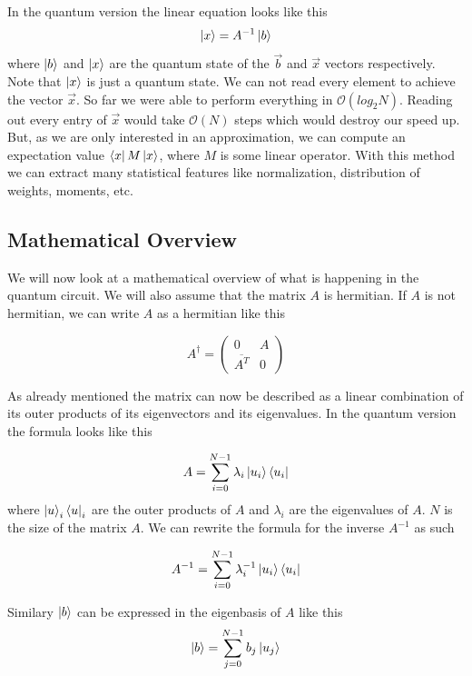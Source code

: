 In the quantum version the linear equation looks like this
\begin{equation}
\ket{x} = A^{-1}\ket{b}
\end{equation}
where $\ket b$ and $\ket x$ are the quantum state of the $\vec b$ and $\vec x$ vectors respectively.
Note that  $\ket x$ is just a quantum state. 
We can not read every element to achieve the vector $\vec x$. 
So far we were able to perform everything in $\mathcal{O}(log_2 N)$.
Reading out every entry of $\vec x$ would take $\mathcal{O} (N)$ steps which would destroy our speed up.
But, as we are only interested in an approximation, we can compute an expectation value $\bra x M \ket x$, where $M$ is some linear operator. 
With this method we can extract many statistical features like normalization, distribution of weights, moments, etc.



\subsection{Mathematical Overview}
We will now look at a mathematical overview of what is happening in the quantum circuit.
We will also assume that the matrix $A$ is hermitian. If $A$ is not hermitian, we can write $A$ as a hermitian like this

\begin{equation}
A^\dagger = \begin{pmatrix} 0 & A \\ \overline{A^T}& 0 \end{pmatrix}
\end{equation}

As already mentioned the matrix can now be described as a linear combination of its outer products of its eigenvectors and its eigenvalues.
In the quantum version the formula looks like this

\begin{equation}
A = \sum_{i=0}^{N-1} \lambda_i \ket{u_i}\bra{u_i}
\end{equation}
where $\ket u_i  \bra u_i$ are the outer products of $A$ and $\lambda_i$ are the eigenvalues of $A$. 
$N$ is the size of the matrix $A$.
We can rewrite the formula for the inverse $A^{-1}$ as such

\begin{equation}
A^{-1} = \sum_{i=0}^{N-1} \lambda_i^{-1} \ket{u_i}\bra{u_i}
\end{equation}

Similary $\ket b$ can be expressed in the eigenbasis of $A$ like this
\begin{equation}
\ket{b} = \sum_{j=0}^{N-1} b_j\ket{u_j}
\end{equation}

